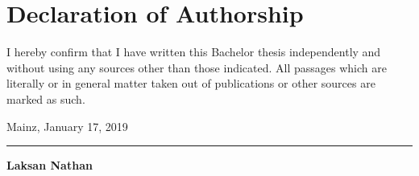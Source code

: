 
\chapter*{Declaration of Authorship}

I hereby confirm that I have written this Bachelor thesis independently and without using any sources other than those indicated. All passages which are literally or in general matter
taken out of publications or other sources are marked as such.
\vspace{0.5cm}

Mainz, January 17, 2019 \vspace{1.5cm} 


\noindent\rule{9cm}{0.5pt} \vspace{0.1cm}

\bf{Laksan Nathan}
